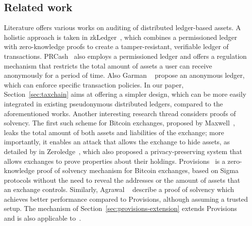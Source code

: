 \subsection{Related work}\label{sec:related}

Literature offers various works on auditing of distributed ledger-based assets.
A holistic approach is taken in zkLedger~\cite{narula2018zkledger}, which
combines a permissioned ledger with zero-knowledge proofs to create a
tamper-resistant, verifiable ledger of transactions.
PRCash~\cite{EPRINT:WKCC18} also employs a permissioned ledger and offers a
regulation mechanism that restricts the total amount of assets a user can
receive anonymously for a period of time. Also Garman
\etal~\cite{FC:GarGreMie16} propose an anonymous ledger, which can enforce
specific transaction policies. In our paper, Section~\ref{sec:taxchain} aims at
offering a simpler design, which can be more easily integrated in existing
pseudonymous distributed ledgers, compared to the aforementioned works. Another
interesting research thread considers proofs of solvency. The first such scheme
for Bitcoin exchanges, proposed by Maxwell~\cite{wilcox2014proving}, leaks the
total amount of both assets and liabilities of the exchange; more importantly,
it enables an attack that allows the exchange to hide assets, as detailed by in
Zeroledge~\cite{doernerzeroledge}, which also proposed a privacy-preserving
system that allows exchanges to prove properties about their holdings.
Provisions~\cite{CCS:DBBCB15} is a zero-knowledge proof of solvency mechanism
for Bitcoin exchanges, based on Sigma protocols \ie without the need to reveal
the addresses or the amount of assets that an exchange controls. Similarly,
Agrawal \etal~\cite{C:AgrGanMoh18} describe a proof of solvency which achieves
better performance compared to Provisions, although assuming a trusted setup.
The mechanism of Section~\ref{sec:provisions-extension} extends
Provisions and is also applicable to~\cite{C:AgrGanMoh18}.
